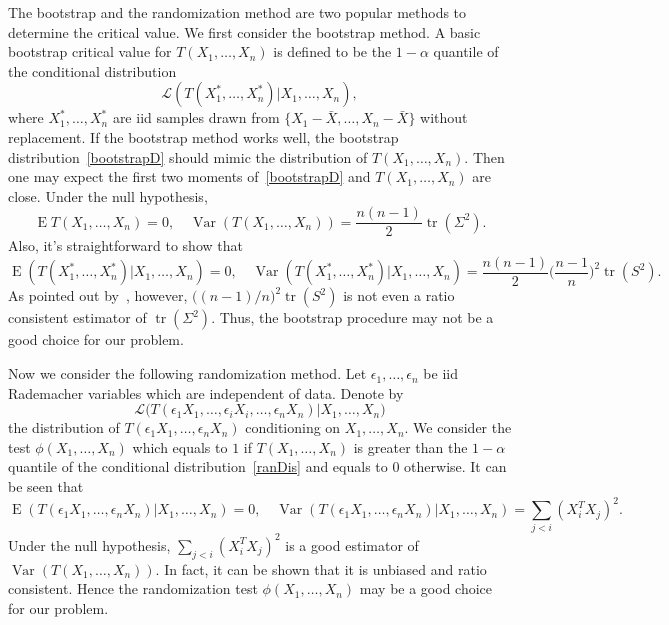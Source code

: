 \documentclass[3p]{elsarticle}
\DeclareMathOperator{\mytr}{tr}
\DeclareMathOperator{\myE}{E}
\DeclareMathOperator{\myVar}{Var}
\theoremstyle{plain}
\theoremstyle{definition}
\theoremstyle{remark}
\begin{document}
The bootstrap and the randomization method are two popular methods to determine the critical value.
We first consider the bootstrap method.
A basic bootstrap critical value for $T(X_1,\ldots,X_n)$ is defined to be the $1-\alpha$ quantile of the conditional distribution
 \begin{equation}\label{bootstrapD}
 \mathcal{L}(T(X_1^*,\ldots,X_n^*)|X_1,\ldots,X_n),
 \end{equation}
        where $X_1^*,\ldots,X_n^*$ are iid samples drawn from $\{X_1-\bar{X},\ldots,X_n-\bar{X}\}$ without replacement.
        If the bootstrap method works well, the bootstrap distribution~\eqref{bootstrapD} should mimic the distribution of $T(X_1,\ldots,X_n)$.
Then one may expect the first two moments of~\eqref{bootstrapD} and $T(X_1,\ldots,X_n)$ are close.
        Under the null hypothesis,
        $$
 \myE T(X_1,\ldots,X_n)=0,
 \quad
 \myVar(T(X_1,\ldots,X_n))=\frac{n(n-1)}{2} \mytr(\Sigma^2).
        $$
Also, it's straightforward to show that
$$
 \myE(T(X_1^*,\ldots,X_n^*)|X_1,\ldots,X_n)=0,
 \quad
 \myVar(T(X_1^*,\ldots,X_n^*)|X_1,\ldots,X_n)=\frac{n(n-1)}{2}\big(\frac{n-1}{n}\big)^2 \mytr(S^2).
$$
As pointed out by~\cite{Bai1996Efiect}, however, $\big((n-1)/{n}\big)^2 \mytr(S^2)$ is not even a ratio consistent estimator of $\mytr(\Sigma^2)$.
Thus, the bootstrap procedure may not be a good choice for our problem.

Now we consider the following randomization method.
Let $\epsilon_1,\ldots,\epsilon_n$ be iid Rademacher variables which are independent of data.
Denote by
\begin{equation}\label{ranDis}
    \mathcal{L}\big(T(\epsilon_1 X_1,\ldots,\epsilon_i X_i,\ldots,\epsilon_n X_n)|X_1,\ldots,X_n\big)
\end{equation}
the distribution of $T(\epsilon_1 X_1,\ldots,\epsilon_n X_n)$ conditioning on $X_1,\ldots,X_n$.
We consider the test $\phi(X_1,\ldots,X_n)$ which equals to $1$ if $T(X_1,\ldots, X_n)$ is greater than the $1-\alpha$ quantile of the conditional distribution~\eqref{ranDis} and equals to $0$ otherwise.
It can be seen that
$$
 \myE(T(\epsilon_1 X_1,\ldots,\epsilon_n X_n)|X_1,\ldots,X_n)=0,
 \quad
 \myVar(T(\epsilon_1 X_1,\ldots,\epsilon_n X_n)|X_1,\ldots,X_n)=\sum_{j<i} (X_i^T X_j)^2.
$$
Under the null hypothesis, $\sum_{j<i} (X_i^T X_j)^2$ is a good estimator of $\myVar(T(X_1,\ldots,X_n))$.
In fact, it can be shown that it is unbiased and ratio consistent.
Hence the randomization test $\phi(X_1,\ldots,X_n)$ may be a good choice for our problem.
\end{document}

